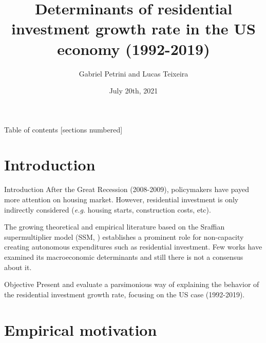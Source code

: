 \documentclass[10pt]{beamer}
\institute{Institute of Economics - University of Campinas/Brazil}
\author{Gabriel Petrini and Lucas Teixeira}
\date{July 20th, 2021}
\title{Determinants of residential investment growth rate in the US economy (1992-2019)}
\begin{document}
\maketitle





\begin{frame}{Table of contents}
  [sections numbered]
  \tableofcontents[hideallsubsections]
\end{frame}

\section{Introduction}
\label{sec:org90edf24}

\begin{frame}[label={sec:org918350a}]{Introduction}
After the Great Recession (2008-2009), policymakers have payed more attention on housing market.
However, residential investment is only \alert{indirectly} considered (\emph{e.g.} housing starts, construction costs, etc).

The growing theoretical and empirical literature based on the Sraffian supermultiplier model (SSM, \cites{serrano_long_1995}{bortis_institutions_1997}) establishes a prominent role for non-capacity creating autonomous expenditures such as \alert{residential investment}.
Few works have examined its \alert{macroeconomic} determinants and still there is not a consensus about it.


\begin{block}{Objective}
Present and evaluate a parsimonious way of explaining the behavior of the residential investment growth rate, focusing on the US case (1992-2019).
\end{block}
\end{frame}

\section{Empirical motivation}
\label{sec:org2149dfe}
\end{document}
